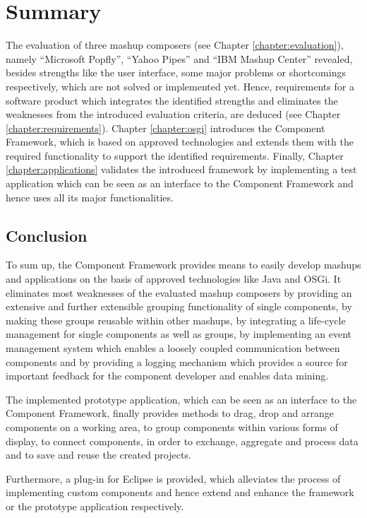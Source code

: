 \chapter{Summary}
\label{chapter:summary}

The evaluation of three mashup composers (see Chapter \ref{chapter:evaluation}), namely
``Microsoft Popfly'', ``Yahoo Pipes'' and ``IBM Mashup Center'' revealed, besides strengths like
the user interface, some major problems or shortcomings respectively, which are not solved or
implemented yet. Hence, requirements for a software product which integrates the identified
strengths and eliminates the weaknesses from the introduced evaluation criteria, are deduced (see
Chapter \ref{chapter:requirements}). Chapter \ref{chapter:osgi} introduces the Component Framework,
which is based on approved technologies and extends them with the required functionality to support
the identified requirements. Finally, Chapter \ref{chapter:applications} validates the introduced
framework by implementing a test application which can be seen as an interface to the Component
Framework and hence uses all its major functionalities.

\section{Conclusion}

To sum up, the Component Framework provides means to easily develop mashups and applications on the
basis of approved technologies like Java and OSGi. It eliminates most weaknesses of the evaluated
mashup composers by providing an extensive and further extensible grouping functionality of single
components, by making these groups reusable within other mashups, by integrating a life-cycle
management for single components as well as groups, by implementing an event management system
which enables a loosely coupled communication between components and by providing a logging
mechanism which provides a source for important feedback for the component developer and enables
data mining.

The implemented prototype application, which can be seen as an interface to the Component Framework,
finally provides methods to drag, drop and arrange components on a working area, to group components
within various forms of display, to connect components, in order to exchange, aggregate and process
data and to save and reuse the created projects.

Furthermore, a plug-in for Eclipse is provided, which alleviates the process of implementing custom
components and hence extend and enhance the framework or the prototype application respectively.

